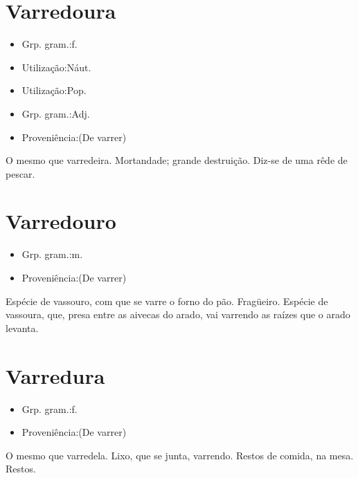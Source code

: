 \documentclass{article}
\begin{document}
\section{Varredoura}
\begin{itemize}
\item {Grp. gram.:f.}
\end{itemize}
\begin{itemize}
\item {Utilização:Náut.}
\end{itemize}
\begin{itemize}
\item {Utilização:Pop.}
\end{itemize}
\begin{itemize}
\item {Grp. gram.:Adj.}
\end{itemize}
\begin{itemize}
\item {Proveniência:(De \textunderscore varrer\textunderscore )}
\end{itemize}
O mesmo que \textunderscore varredeira\textunderscore .
Mortandade; grande destruição.
Diz-se de uma rêde de pescar.
\section{Varredouro}
\begin{itemize}
\item {Grp. gram.:m.}
\end{itemize}
\begin{itemize}
\item {Proveniência:(De \textunderscore varrer\textunderscore )}
\end{itemize}
Espécie de vassouro, com que se varre o forno do pão.
Fragüeiro.
Espécie de vassoura, que, presa entre as aivecas do arado, vai varrendo as raízes que o arado levanta.
\section{Varredura}
\begin{itemize}
\item {Grp. gram.:f.}
\end{itemize}
\begin{itemize}
\item {Proveniência:(De \textunderscore varrer\textunderscore )}
\end{itemize}
O mesmo que \textunderscore varredela\textunderscore .
Lixo, que se junta, varrendo.
Restos de comida, na mesa.
Restos.
\end{document}
